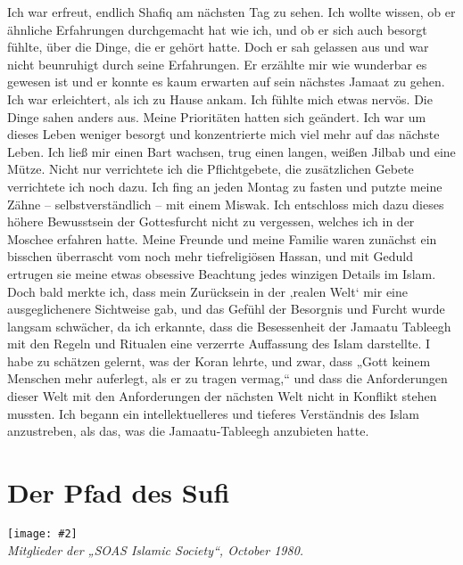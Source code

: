 \documentclass[12pt]{memoir}
\newcommand{\img}[3]{\begin{center}%
\texttt{[image: \#2]}\\{\small\em#3}%
\end{center}}
\begin{document}
Ich war erfreut, endlich Shafiq am nächsten Tag zu sehen.
Ich wollte wissen, ob er ähnliche Erfahrungen durchgemacht hat wie ich,
und ob er sich auch besorgt fühlte, über die Dinge, die er gehört hatte.
Doch er sah gelassen aus und war nicht beunruhigt durch seine Erfahrungen.
Er erzählte mir wie wunderbar es gewesen ist
und er konnte es kaum erwarten auf sein nächstes Jamaat zu gehen.
Ich war erleichtert, als ich zu Hause ankam.
Ich fühlte mich etwas nervös.
Die Dinge sahen anders aus.
Meine Prioritäten hatten sich geändert.
Ich war um dieses Leben weniger besorgt
und konzentrierte mich viel mehr auf das nächste Leben.
Ich ließ mir einen Bart wachsen, trug einen langen,
weißen Jilbab und eine Mütze.
Nicht nur verrichtete ich die Pflichtgebete,
die zusätzlichen Gebete verrichtete ich noch dazu.
Ich fing an jeden Montag zu fasten und putzte meine Zähne
– selbstverständlich – mit einem Miswak.
Ich entschloss mich dazu dieses höhere Bewusstsein der Gottesfurcht
nicht zu vergessen, welches ich in der Moschee erfahren hatte.
Meine Freunde und meine Familie waren zunächst ein bisschen überrascht
vom noch mehr tiefreligiösen Hassan,
und mit Geduld ertrugen sie meine etwas obsessive Beachtung
jedes winzigen Details im Islam.
Doch bald merkte ich, dass mein Zurücksein in der ‚realen Welt‘
mir eine ausgeglichenere Sichtweise gab,
und das Gefühl der Besorgnis und Furcht wurde langsam schwächer,
da ich erkannte, dass die Besessenheit der Jamaatu Tableegh mit den Regeln
und Ritualen eine verzerrte Auffassung des Islam darstellte.
I habe zu schätzen gelernt, was der Koran lehrte, und zwar,
dass „Gott keinem Menschen mehr auferlegt, als er zu tragen vermag,“
und dass die Anforderungen dieser Welt mit den Anforderungen
der nächsten Welt nicht in Konflikt stehen mussten.
Ich begann ein intellektuelleres und tieferes Verständnis
des Islam anzustreben, als das, was die Jamaatu-Tableegh anzubieten hatte.


\chapter{Der Pfad des Sufi}

\img{scale=0.7}{Members_SOAS_Islamic_Society.jpg}
{Mitglieder der „SOAS Islamic Society“, October 1980.}
\end{document}
